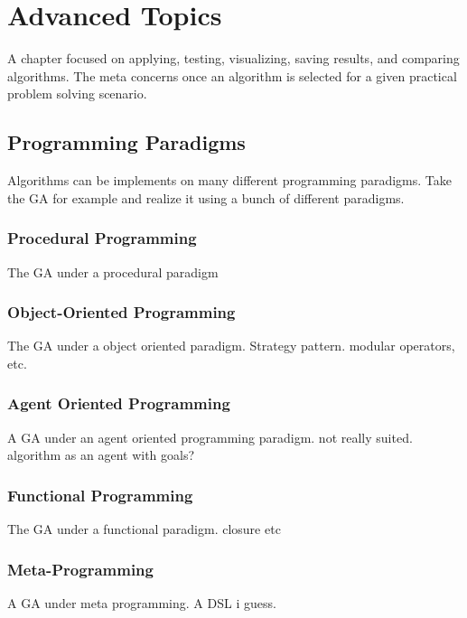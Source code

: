 

\chapter{Advanced Topics}
\label{ch:advanced}
A chapter focused on applying, testing, visualizing, saving results, and comparing algorithms. The meta concerns once an algorithm is selected for a given practical problem solving scenario.

% 
% 
\section{Programming Paradigms}
\label{advanced:sec:paradigms}
Algorithms can be implements on many different programming paradigms.
Take the GA for example and realize it using a bunch of different paradigms.

\subsection{Procedural Programming}
The GA under a procedural paradigm

\subsection{Object-Oriented Programming}
The GA under a object oriented paradigm. Strategy pattern. modular operators, etc.

\subsection{Agent Oriented Programming}
A GA under an agent oriented programming paradigm. not really suited. algorithm as an agent with goals?

\subsection{Functional Programming}
The GA under a functional paradigm. closure etc

\subsection{Meta-Programming}
A GA under meta programming. A DSL i guess.

